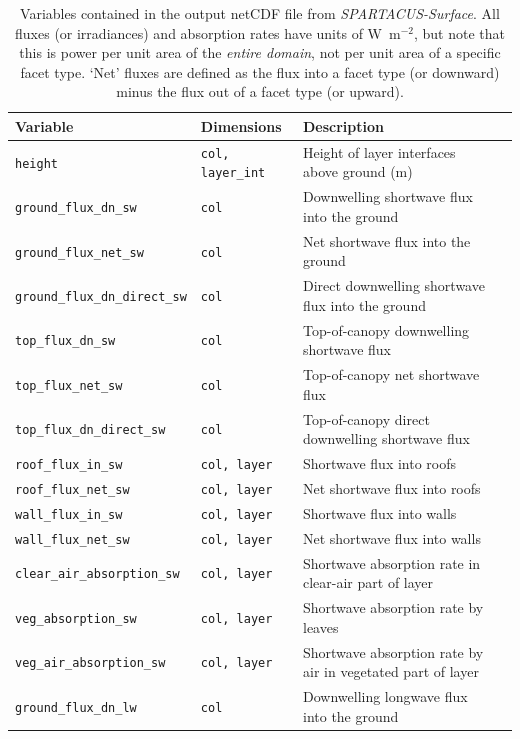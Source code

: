 \documentclass[a4,oneside]{article}
\def\tablesetup{\rowcolors{2}{light-gray}{light-gray}\footnotesize}
\def\codetabsize{\footnotesize}
\def\spsurf{\emph{SPARTACUS-Surface}}
\def\codetab#1{{\codetabsize\texttt{#1}}}
\begin{document}
\begin{center}
\tablesetup
\begin{longtable}{llLp{7cm}}%
\caption{\label{tab:outvar}Variables contained in the output netCDF
  file from \spsurf.  All fluxes (or irradiances) and absorption rates
  have units of W~m$^{-2}$, but note that this is power per unit area
  of the \emph{entire domain}, not per unit area of a specific facet
  type.  `Net' fluxes are defined as the flux into a facet type (or downward) minus the
  flux out of a facet type (or upward).}\\
%
\hline
Variable & Dimensions & Description\\
\hline
\codetab{height} & \codetab{col, layer\_int} & Height of layer interfaces above ground (m)\\
\codetab{ground\_flux\_dn\_sw} & \codetab{col} & Downwelling shortwave flux into the ground \\
\codetab{ground\_flux\_net\_sw} & \codetab{col} & Net shortwave flux into the ground\\
\codetab{ground\_flux\_dn\_direct\_sw} & \codetab{col} & Direct downwelling shortwave flux into the ground\\
\codetab{top\_flux\_dn\_sw} & \codetab{col} & Top-of-canopy downwelling shortwave flux\\
\codetab{top\_flux\_net\_sw} & \codetab{col} & Top-of-canopy net shortwave flux\\
\codetab{top\_flux\_dn\_direct\_sw} & \codetab{col} & Top-of-canopy direct downwelling shortwave flux\\
\codetab{roof\_flux\_in\_sw} & \codetab{col, layer} & Shortwave flux into roofs \\
\codetab{roof\_flux\_net\_sw} & \codetab{col, layer} & Net shortwave flux into roofs\\
\codetab{wall\_flux\_in\_sw} & \codetab{col, layer} & Shortwave flux into walls\\
\codetab{wall\_flux\_net\_sw} & \codetab{col, layer} & Net shortwave flux into walls\\
\codetab{clear\_air\_absorption\_sw} & \codetab{col, layer} & Shortwave absorption rate in clear-air part of layer\\
\codetab{veg\_absorption\_sw} & \codetab{col, layer} & Shortwave absorption rate by leaves\\
\codetab{veg\_air\_absorption\_sw} & \codetab{col, layer} & Shortwave absorption rate by air in vegetated part of layer\\
\codetab{ground\_flux\_dn\_lw} & \codetab{col} & Downwelling longwave flux into the ground\\

\end{longtable}
\end{center}
\end{document}
